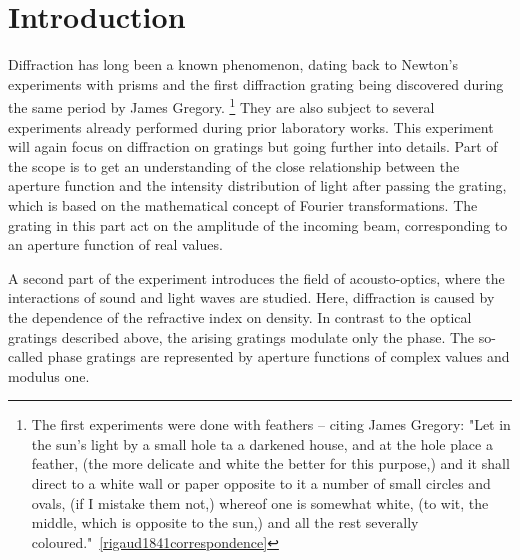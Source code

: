 \section{Introduction}

Diffraction has long been a known phenomenon, dating back to Newton's 
experiments with prisms and the first diffraction grating being discovered 
during the same period by James Gregory.%
\footnote{%
The first experiments were done with feathers -- citing James Gregory:
"Let in the sun's light by a small hole ta a darkened house, and at the hole place 
a feather, (the more delicate and white the better for this purpose,) 
and it shall direct to a white wall or paper opposite to it a number of small circles 
and ovals, (if I mistake them not,) whereof one is somewhat white, 
(to wit, the middle, which is opposite to the sun,) 
and all the rest severally coloured."~\ref{rigaud1841correspondence}
}%
They are also subject to several experiments already performed during 
prior laboratory works. This experiment will again focus on diffraction 
on gratings but going further into details. Part of the scope is to 
get an understanding of the close relationship between the aperture function 
and the intensity distribution of light after passing the grating, 
which is based on the mathematical concept of Fourier transformations. 
The grating in this part act on the amplitude of the incoming beam, 
corresponding to an aperture function of real values.

A second part of the experiment introduces the field of acousto-optics, 
where the interactions of sound and light waves are studied. Here, 
diffraction is caused by the dependence of the refractive index on 
density. In contrast to the optical gratings described above, 
the arising gratings modulate only the phase. The so-called phase gratings
are represented by aperture functions of complex values and 
modulus one. 


